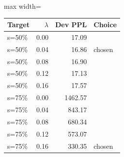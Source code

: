 \scriptsize
\setlength{\tabcolsep}{3.5pt}
\label{tab:t1p3dev}
\begin{adjustbox}{max width=\linewidth}
\begin{tabular}{lrrl}
\toprule
Target & $\lambda$ & Dev PPL & Choice \\
\midrule
s=50\% & 0.00 & 17.09 &  \\
s=50\% & 0.04 & 16.86 & chosen \\
s=50\% & 0.08 & 16.90 &  \\
s=50\% & 0.12 & 17.13 &  \\
s=50\% & 0.16 & 17.57 &  \\
s=75\% & 0.00 & 1462.57 &  \\
s=75\% & 0.04 & 843.17 &  \\
s=75\% & 0.08 & 680.34 &  \\
s=75\% & 0.12 & 573.07 &  \\
s=75\% & 0.16 & 330.35 & chosen \\
\bottomrule
\end{tabular}
\end{adjustbox}
